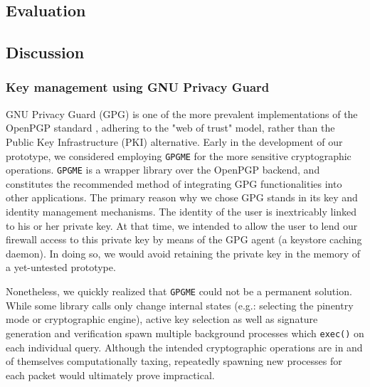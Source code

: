 \subsection{Evaluation}
\label{sign:linux:evaluation}






\subsection{Discussion}
\label{sign:linux:discussion}

\subsubsection{Key management using GNU Privacy Guard}
\label{sign:linux:discussion:gpg}

GNU Privacy Guard (GPG) is one of the more prevalent implementations of the OpenPGP standard \cite{rfc4880}, adhering to the "web of trust" model, rather than the Public Key Infrastructure (PKI) \cite{maurer1996modelling} alternative. Early in the development of our prototype, we considered employing \texttt{GPGME} for the more sensitive cryptographic operations. \texttt{GPGME} is a wrapper library over the OpenPGP backend, and constitutes the recommended method of integrating GPG functionalities into other applications. The primary reason why we chose GPG stands in its key and identity management mechanisms. The identity of the user is inextricably linked to his or her private key. At that time, we intended to allow the user to lend our firewall access to this private key by means of the GPG agent (a keystore caching daemon). In doing so, we would avoid retaining the private key in the memory of a yet-untested prototype.

Nonetheless, we quickly realized that \texttt{GPGME} could not be a permanent solution. While some library calls only change internal states (e.g.: selecting the pinentry mode or cryptographic engine), active key selection as well as signature generation and verification spawn multiple background processes which \texttt{exec()} on each individual query. Although the intended cryptographic operations are in and of themselves computationally taxing, repeatedly spawning new processes for each packet would ultimately prove impractical.


